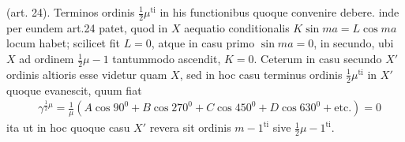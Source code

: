(art. 24). Terminos ordinis $\frac12\mu^{\mathrm{ti}}$ in his functionibus quoque convenire debere.
inde per eundem art.24 patet, quod in $X$ aequatio conditionalis $K\sin ma=L\cos ma$
locum habet; scilicet fit $L=0$, atque in casu primo $\sin ma=0$, in secundo,
ubi $X$ ad ordinem $\frac12\mu-1$ tantummodo ascendit, $K=0$. Ceterum in casu
secundo $X'$ ordinis altioris esse videtur quam $X$, sed in hoc casu terminus ordinis $\frac12\mu^{\mathrm{ti}}$ in $X'$ quoque evanescit, quum fiat
\[
\begin{aligned}
&\gamma^{\frac12\mu}=\frac{1}{\mu}(A\cos 90^{{\mathord{0}}}+B\cos 270^{{\mathord{0}}}+C\cos 450^{{\mathord{0}}}+D\cos 630^{{\mathord{0}}}+\mathrm{etc.})=0
\end{aligned}
\]
ita ut in hoc quoque casu $X'$ revera sit ordinis $m-1^{\mathrm{ti}}$ sive $\frac12\mu-1^{\mathrm{ti}}$.


